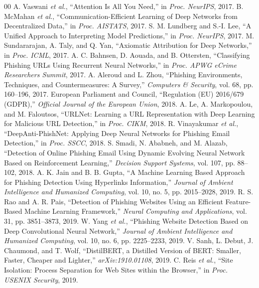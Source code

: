 \documentclass[conference]{IEEEtran}
\begin{document}
\begin{thebibliography}{00}
 A. Vaswani \textit{et al.}, ``Attention Is All You Need,'' in \textit{Proc. NeurIPS}, 2017.
 B. McMahan \textit{et al.}, ``Communication-Efficient Learning of Deep Networks from Decentralized Data,'' in \textit{Proc. AISTATS}, 2017.
 S. M. Lundberg and S.-I. Lee, ``A Unified Approach to Interpreting Model Predictions,'' in \textit{Proc. NeurIPS}, 2017.
 M. Sundararajan, A. Taly, and Q. Yan, ``Axiomatic Attribution for Deep Networks,'' in \textit{Proc. ICML}, 2017.
 A. C. Bahnsen, D. Aouada, and B. Ottersten, ``Classifying Phishing URLs Using Recurrent Neural Networks,'' in \textit{Proc. APWG eCrime Researchers Summit}, 2017.
 A. Aleroud and L. Zhou, ``Phishing Environments, Techniques, and Countermeasures: A Survey,'' \textit{Computers \& Security}, vol. 68, pp. 160--196, 2017.
 European Parliament and Council, ``Regulation (EU) 2016/679 (GDPR),'' \textit{Official Journal of the European Union}, 2018.
 A. Le, A. Markopoulou, and M. Faloutsos, ``URLNet: Learning a URL Representation with Deep Learning for Malicious URL Detection,'' in \textit{Proc. CIKM}, 2018.
 R. Vinayakumar \textit{et al.}, ``DeepAnti-PhishNet: Applying Deep Neural Networks for Phishing Email Detection,'' in \textit{Proc. SSCC}, 2018.
 S. Smadi, N. Ababneh, and M. Alazab, ``Detection of Online Phishing Email Using Dynamic Evolving Neural Network Based on Reinforcement Learning,'' \textit{Decision Support Systems}, vol. 107, pp. 88--102, 2018.
 A. K. Jain and B. B. Gupta, ``A Machine Learning Based Approach for Phishing Detection Using Hyperlinks Information,'' \textit{Journal of Ambient Intelligence and Humanized Computing}, vol. 10, no. 5, pp. 2015--2028, 2019.
 R. S. Rao and A. R. Pais, ``Detection of Phishing Websites Using an Efficient Feature-Based Machine Learning Framework,'' \textit{Neural Computing and Applications}, vol. 31, pp. 3851--3873, 2019.
 W. Yang \textit{et al.}, ``Phishing Website Detection Based on Deep Convolutional Neural Network,'' \textit{Journal of Ambient Intelligence and Humanized Computing}, vol. 10, no. 6, pp. 2225--2233, 2019.
 V. Sanh, L. Debut, J. Chaumond, and T. Wolf, ``DistilBERT, a Distilled Version of BERT: Smaller, Faster, Cheaper and Lighter,'' \textit{arXiv:1910.01108}, 2019.
 C. Reis \textit{et al.}, ``Site Isolation: Process Separation for Web Sites within the Browser,'' in \textit{Proc. USENIX Security}, 2019.

\end{thebibliography}
\end{document}
